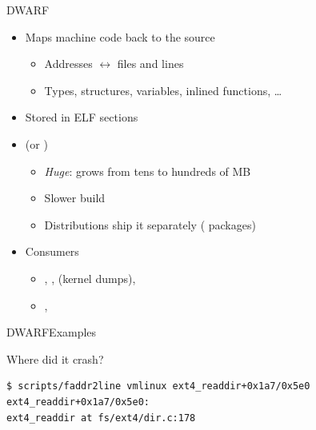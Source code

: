 \begin{frame}{DWARF}

  \begin{itemize}[<+->]
    \item Maps machine code back to the source
      \begin{itemize}[<.->]
	\item Addresses $\leftrightarrow$ files and lines
	\item Types, structures, variables, inlined functions, \dots
      \end{itemize}
    \item Stored in ELF sections 
    \item {} (or )
      \begin{itemize}[<.->]
	\item \emph{Huge}:  grows from tens to hundreds of MB
	\item Slower build
	\item Distributions ship it separately ( packages)
      \end{itemize}
    \item Consumers
      \begin{itemize}[<.->]
	\item {}, ,  (kernel dumps), 
	\item {}, 
      \end{itemize}
  \end{itemize}

\end{frame}

\begin{frame}[fragile]{DWARF}{Examples}

  \begin{block}{Where did it crash?}
    \begin{lstlisting}[language=bash]
$ scripts/faddr2line vmlinux ext4_readdir+0x1a7/0x5e0
ext4_readdir+0x1a7/0x5e0:
ext4_readdir at fs/ext4/dir.c:178
    \end{lstlisting}
  \end{block}

\end{frame}

